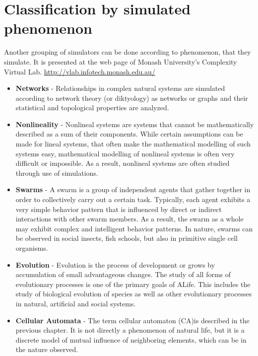 \documentclass[a4paper,12pt]{report}
\begin{document}
\section{Classification by simulated phenomenon}
Another grouping of simulators can be done according to phenomenon, that they simulate. It is presented at the web page of Monash University’s Complexity Virtual Lab. \url{http://vlab.infotech.monash.edu.au/}
\begin{itemize}
  \item \textbf{Networks} - Relationships in complex natural systems are simulated according to network theory (or diktyology) as networks or graphs and their statistical and topological properties are analyzed. 
  \item \textbf{Nonlineality} - Nonlineal systems are systems that cannot be mathematically described as a sum of their components. While certain assumptions can be made for lineal systems, that often make the mathematical modelling of such systems easy, mathematical modelling of nonlineal systems is often very difficult or impossible. As a result, nonlineal systems are often studied through use of simulations.
  \item \textbf{Swarms} - A swarm is a group of independent agents that gather together in order to collectively carry out a certain task. Typically, each agent exhibits a very simple behavior pattern that is influenced by direct or indirect interactions with other swarm members. As a result, the swarm as a whole may exhibit complex and intelligent behavior patterns. In nature, swarms can be observed in social insects, fish schools, but also in primitive single cell organisms.
  \item \textbf{Evolution} - Evolution is the process of development or grows by accumulation of small advantageous changes. The study of all forms of evolutionary processes is one of the primary goals of ALife. This includes the study of biological evolution of species as well as other evolutionary processes in natural, artificial and social systems.
  \item \textbf{Cellular Automata} - The term cellular automaton (CA)is described in the previous chapter. It is not directly a phenomenon of natural life, but it is a discrete model of mutual influence of neighboring elements, which can be in the nature observed. 
\end{itemize}  
\end{document}
